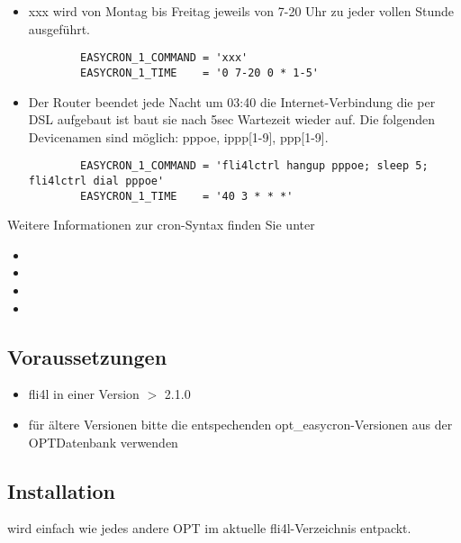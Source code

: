 \begin{description}
\begin{itemize}
\item   xxx wird von Montag bis Freitag jeweils von 7-20 Uhr zu jeder
       vollen Stunde ausgeführt.
\begin{example}
\begin{verbatim}
        EASYCRON_1_COMMAND = 'xxx'
        EASYCRON_1_TIME    = '0 7-20 0 * 1-5'
\end{verbatim}
\end{example}



\item   Der Router beendet jede Nacht um 03:40 die Internet-Verbindung
       die per DSL aufgebaut ist baut sie nach 5sec Wartezeit wieder auf.
       Die folgenden Devicenamen sind möglich: pppoe, ippp[1-9], ppp[1-9].
\begin{example}
\begin{verbatim}
        EASYCRON_1_COMMAND = 'fli4lctrl hangup pppoe; sleep 5; fli4lctrl dial pppoe'
        EASYCRON_1_TIME    = '40 3 * * *'
\end{verbatim}
\end{example}


\end{itemize}



       Weitere Informationen zur cron-Syntax finden Sie unter
       \begin{itemize}
       \item {} 
       \item {} 
       \item {}
       \item {}
       \end{itemize}





\subsection{Voraussetzungen}

\begin{itemize}
\item fli4l in einer Version $>$ 2.1.0    
\item für ältere Versionen bitte die entspechenden
  opt\_easycron-Versionen aus der OPT\-Datenbank verwenden
\end{itemize}



\subsection{Installation}

 wird einfach wie jedes andere OPT im aktuelle
fli4l-Verzeichnis entpackt.


\end{description}
